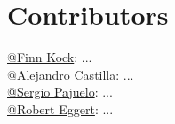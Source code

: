 \section{Contributors}

\href{https://github.com/finnkock}{@Finn Kock}: ... \\
\href{https://github.com/alecasbar}{@Alejandro Castilla}: ...\\
\href{https://github.com/sergioPajuelo}{@Sergio Pajuelo}: ...\\ 
\href{https://github.com/RobertEggert}{@Robert Eggert}: ...\\